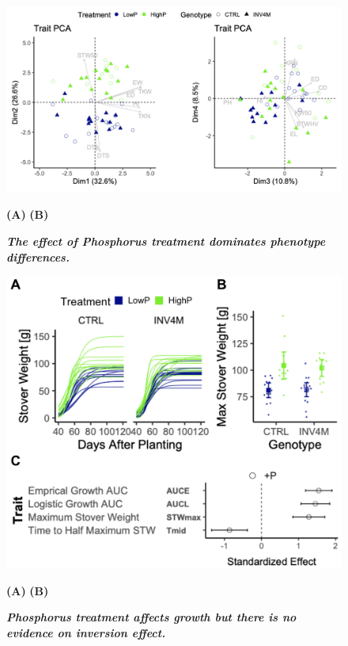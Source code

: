 \begin{figure}[!ht]
\centering
\includegraphics[width=\linewidth]{Chapter-3/figs/traitPCA.png}
\caption[The effect of Phosphorus treatment dominates phenotype differences]{\textit{\textbf{The effect of Phosphorus treatment dominates phenotype differences.}}}
\textbf{(A)} 
\textbf{(B)}

\label{fig::\textbf{(B)}}
\end{figure}

\begin{figure}[!ht]
\includegraphics[width=\linewidth]{Chapter-3/figs/growth.png}
\caption[Phosphorus treatment affects growth but there is no evidence on inversion effect]{\textit{\textbf{Phosphorus treatment affects growth but there is no evidence on inversion effect.}}}
\textbf{(A)} 
\textbf{(B)}

\label{fig::\textbf{(B)}}
\end{figure}


